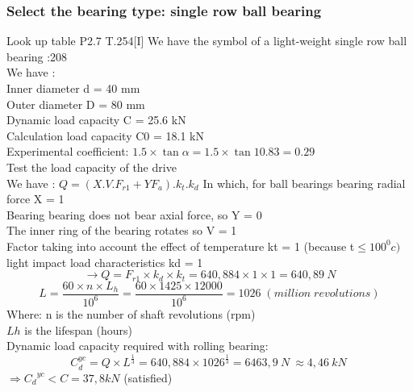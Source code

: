 \subsubsection{Select the bearing type: single row ball bearing }
Look up table P2.7 T.254[I] We have the symbol of a light-weight single row ball bearing :208\\
We have :\\
Inner diameter d = 40 mm\\
Outer diameter D = 80 mm\\
Dynamic load capacity C = 25.6 kN\\
Calculation load capacity C0 = 18.1 kN\\
Experimental coefficient: $1.5\times \tan \alpha=1.5\times \tan10.83= 0.29$  \\
Test the load capacity of the drive\\
We have : $Q=(X.V.F_{r1}+YF_a).k_t.k_d$
In which, for ball bearings bearing radial force X = 1\\
Bearing bearing does not bear axial force, so Y = 0\\
The inner ring of the bearing rotates so V = 1\\
Factor taking into account the effect of temperature kt = 1 (because t$\le100^0c)$\\
light impact load characteristics kd = 1
$$\rightarrow Q=F_{r1}\times k_d\times k_t=640,884\times1\times1=640,89\ N$$
$$L=\frac{60\times n\times L_h}{{10}^6}=\frac{60\times1425\times12000}{{10}^6}=1026 \;( million\; revolutions) $$
Where: n is the number of shaft revolutions (rpm)\\
$Lh$ is the lifespan (hours)\\
Dynamic load capacity required with rolling bearing:\\
$$C_d^{yc}=Q\times L^\frac{1}{3}=640,884\times{1026}^\frac{1}{3}=6463,9\ N\ \approx4,46\ kN\ $$
$\Rightarrow{C_d}^{yc}<C=37,8kN $ (satisfied)
